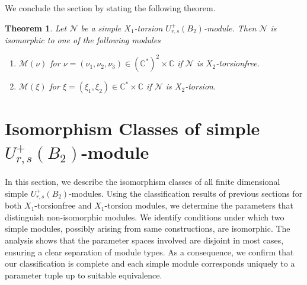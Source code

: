\documentclass[12 pt,reqno]{amsart}
\numberwithin{equation}{section}
\newtheorem{theorem}[thm]{Theorem}
\theoremstyle{definition}
\theoremstyle{definition}
\theoremstyle{remark}
\theoremstyle{remark}
\begin{document}
We conclude the section by stating the following theorem.
\begin{theorem}\label{m4}
    Let $\mathcal{N}$ be a simple $X_1$-torsion $U_{r,s}^+(B_2)$-module. Then $\mathcal{N}$ is isomorphic to one of the following modules
    \begin{enumerate}[label= \((\arabic*)\)]
        \item $ \mathcal{M}(\nu) $ for $ \nu = (\nu_1, \nu_2, \nu_3) \in (\mathbb{C}^*)^2 \times \mathbb{C} $ if $\mathcal{N}$ is $X_2$-torsionfree.
        \item $ \mathcal{M}(\xi) $ for $ \xi = (\xi_1, \xi_2) \in \mathbb{C}^*\times \mathbb{C} $ if $\mathcal{N}$ is $X_2$-torsion. 
    \end{enumerate}
\end{theorem}
\section{\texorpdfstring{Isomorphism Classes of simple $U_{r,s}^+(B_2)$-module}{}}


In this section, we describe the isomorphism classes of all finite dimensional simple $ U^+_{r,s}(B_2)$-modules. Using the classification results of previous sections for both $ X_1 $-torsionfree and $ X_1 $-torsion modules, we determine the parameters that distinguish non-isomorphic modules. We identify conditions under which two simple modules, possibly arising from same constructions, are isomorphic. The analysis shows that the parameter spaces involved are disjoint in most cases, ensuring a clear separation of module types. As a consequence, we confirm that our classification is complete and each simple module corresponds uniquely to a parameter tuple up to suitable equivalence.
\end{document}
